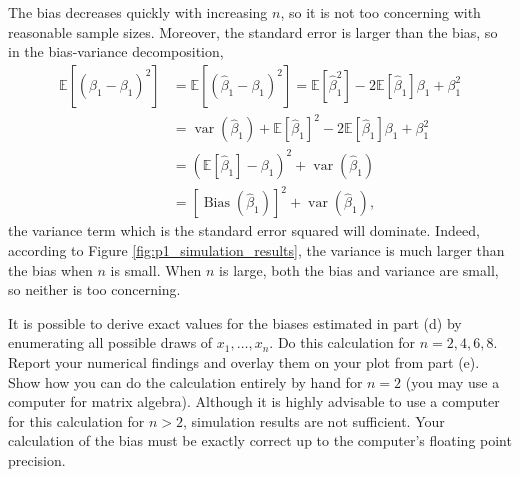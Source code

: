 \documentclass[11pt, letterpaper]{article}
\begin{document}
{\begin{enumerate}[(a)]
\begin{description}
  The bias decreases quickly with increasing $n$, so it is not too concerning
  with reasonable sample sizes. Moreover, the standard error is larger than the
  bias, so in the bias-variance decomposition,
  \begin{align*}
    \mathbb{E}\left[
      \left(\hat{\beta}_1 - \beta_1\right)^2
    \right]
    &=
      \mathbb{E}\left[
      \left(\hat{\beta}_1 - \beta_1\right)^2
      \right] =
    \mathbb{E}\left[\hat{\beta}_1^2\right] - 2\mathbb{E}\left[\hat{\beta}_1\right]\beta_1 + \beta_1^2  \\
    &= \operatorname{var}\left(\hat{\beta}_1\right) + \mathbb{E}\left[
      \hat{\beta}_1
      \right]^2  - 2\mathbb{E}\left[\hat{\beta}_1\right]\beta_1 + \beta_1^2  \\
    &= \left(\mathbb{E}\left[\hat{\beta}_1\right] - \beta_1\right)^2 + \operatorname{var}\left(\hat{\beta}_1\right) \\
    &= \left[\operatorname{Bias}\left(\hat{\beta}_1\right)\right]^2 + \operatorname{var}\left(\hat{\beta}_1\right),
  \end{align*}
  the variance term which is the standard error squared will dominate. Indeed,
  according to Figure \ref{fig:p1_simulation_results}, the variance is much
  larger than the bias when $n$ is small. When $n$ is large, both the bias and
  variance are small, so neither is too concerning.
\end{description}

{\item It is possible to derive exact values for the biases estimated in part (d) by enumerating all possible draws of $x_1, \ldots, x_n$.  Do this calculation for $n=2,4,6,8$.  Report your numerical findings and overlay them on your plot from part (e).   Show how you can do the calculation entirely by hand for $n=2$ (you may use a computer for matrix algebra).  Although it is highly advisable to use a computer for this calculation for $n>2$, simulation results are not sufficient.  Your calculation of the bias must be exactly correct up to the computer's floating point precision.}
\end{enumerate}



}
\end{document}
